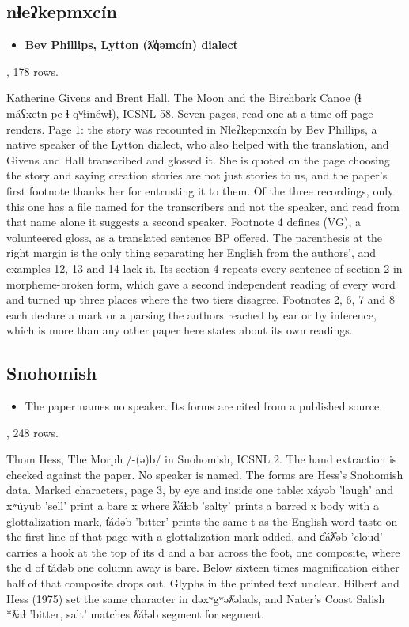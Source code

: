 \subsection{nɬeʔkepmxcín}

\begin{itemize}
\item \textbf{Bev Phillips, Lytton (ƛ̓q̓əmcín) dialect}
\end{itemize}

\cite{src:Givens-and-Hall-2023}, 178 rows.

Katherine Givens and Brent Hall, The Moon and the Birchbark Canoe (ɬ máʕxetn pe ɬ qʷɬinéwɬ), ICSNL 58. Seven pages, read one at a time off page renders. Page 1: the story was recounted in Nɬeʔkepmxcín by Bev Phillips, a native speaker of the Lytton dialect, who also helped with the translation, and Givens and Hall transcribed and glossed it. She is quoted on the page choosing the story and saying creation stories are not just stories to us, and the paper's first footnote thanks her for entrusting it to them. Of the three recordings, only this one has a file named for the transcribers and not the speaker, and read from that name alone it suggests a second speaker. Footnote 4 defines (VG), a volunteered gloss, as a translated sentence BP offered. The parenthesis at the right margin is the only thing separating her English from the authors', and examples 12, 13 and 14 lack it. Its section 4 repeats every sentence of section 2 in morpheme-broken form, which gave a second independent reading of every word and turned up three places where the two tiers disagree. Footnotes 2, 6, 7 and 8 each declare a mark or a parsing the authors reached by ear or by inference, which is more than any other paper here states about its own readings.

\subsection{Snohomish}

\begin{itemize}
\item The paper names no speaker. Its forms are cited from a published source.
\end{itemize}

\cite{src:Hess-1967}, 248 rows.

Thom Hess, The Morph /-(ə)b/ in Snohomish, ICSNL 2. The hand extraction is checked against the paper. No speaker is named. The forms are Hess's Snohomish data. Marked characters, page 3, by eye and inside one table: xáyəb 'laugh' and xʷúyub 'sell' print a bare x where ƛ̓áɬəb 'salty' prints a barred x body with a glottalization mark, t̓ádəb 'bitter' prints the same t as the English word taste on the first line of that page with a glottalization mark added, and d̓áƛ̓əb 'cloud' carries a hook at the top of its d and a bar across the foot, one composite, where the d of t̓ádəb one column away is bare. Below sixteen times magnification either half of that composite drops out. Glyphs in the printed text unclear. Hilbert and Hess (1975) set the same character in dəxʷgʷəƛ̓əlads, and Nater's Coast Salish *ƛ̓aɬ 'bitter, salt' matches ƛ̓áɬəb segment for segment.


